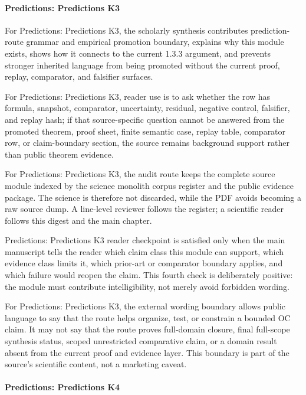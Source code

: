 \paragraph{Predictions: Predictions K3}

For Predictions: Predictions K3, the scholarly synthesis contributes prediction-route grammar and empirical promotion boundary, explains why this module exists, shows how it connects to the current 1.3.3 argument, and prevents stronger inherited language from being promoted without the current proof, replay, comparator, and falsifier surfaces.


For Predictions: Predictions K3, reader use is to ask whether the row has formula, snapshot, comparator, uncertainty, residual, negative control, falsifier, and replay hash; if that source-specific question cannot be answered from the promoted theorem, proof sheet, finite semantic case, replay table, comparator row, or claim-boundary section, the source remains background support rather than public theorem evidence.


For Predictions: Predictions K3, the audit route keeps the complete source module indexed by the science monolith corpus register and the public evidence package. The science is therefore not discarded, while the PDF avoids becoming a raw source dump. A line-level reviewer follows the register; a scientific reader follows this digest and the main chapter.


Predictions: Predictions K3 reader checkpoint is satisfied only when the main manuscript tells the reader which claim class this module can support, which evidence class limits it, which prior-art or comparator boundary applies, and which failure would reopen the claim. This fourth check is deliberately positive: the module must contribute intelligibility, not merely avoid forbidden wording.


For Predictions: Predictions K3, the external wording boundary allows public language to say that the route helps organize, test, or constrain a bounded OC claim. It may not say that the route proves full-domain closure, final full-scope synthesis status, scoped unrestricted comparative claim, or a domain result absent from the current proof and evidence layer. This boundary is part of the source's scientific content, not a marketing caveat.


\paragraph{Predictions: Predictions K4}

